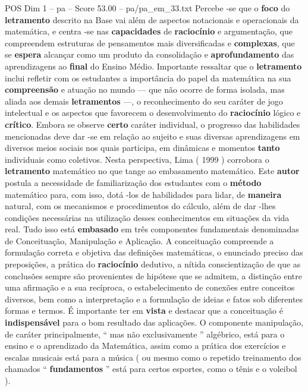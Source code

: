 \begin{textsample}{POS Dim 1 – pa – Score 53.00 – pa/pa\_em\_33.txt}
Percebe -se que o \textbf{foco} do \textbf{letramento} descrito na Base vai além de aspectos notacionais e operacionais da matemática, e centra -se nas \textbf{capacidades} de \textbf{raciocínio} e argumentação, que compreendem estruturas de pensamentos mais diversificadas e \textbf{complexas}, que se \textbf{espera} alcançar como um produto da consolidação e \textbf{aprofundamento} das aprendizagens ao \textbf{final} do Ensino Médio.
Importante ressaltar que o \textbf{letramento} inclui refletir com os estudantes a importância do papel da matemática na sua \textbf{compreensão} e atuação no mundo — que não ocorre de forma isolada, mas aliada aos demais \textbf{letramentos} —, o reconhecimento do seu caráter de jogo intelectual e os aspectos que favorecem o desenvolvimento do \textbf{raciocínio} lógico e \textbf{crítico}.
Embora se observe \textbf{certo} caráter individual, o progresso das habilidades mencionadas deve dar -se em relação ao sujeito e suas diversas aprendizagens em diversos meios sociais nos quais participa, em dinâmicas e momentos \textbf{tanto} individuais como coletivos.
Nesta perspectiva, Lima ( 1999 ) corrobora o \textbf{letramento} matemático no que tange ao embasamento matemático.
Este \textbf{autor} postula a necessidade de familiarização dos estudantes com o \textbf{método} matemático para, com isso, dotá -los de habilidades para lidar, de \textbf{maneira} natural, com os mecanismos e procedimentos do cálculo, além de dar -lhes condições necessárias na utilização desses conhecimentos em situações da vida real.
Tudo isso está \textbf{embasado} em três componentes fundamentais denominadas de Conceituação, Manipulação e Aplicação.
A conceituação compreende a formulação correta e objetiva das definições matemáticas, o enunciado preciso das preposições, a prática do \textbf{raciocínio} dedutivo, a nítida conscientização de que as conclusões sempre são provenientes de hipótese que se admitem, a distinção entre uma afirmação e a sua recíproca, o estabelecimento de conexões entre conceitos diversos, bem como a interpretação e a formulação de ideias e fatos sob diferentes formas e termos.
É importante ter em \textbf{vista} e destacar que a conceituação é \textbf{indispensável} para o bom resultado das aplicações.
O componente manipulação, de caráter principalmente, “ mas não exclusivamente ” algébrico, está para o ensino e o aprendizado da Matemática, assim como a prática dos exercícios e escalas musicais está para a música ( ou mesmo como o repetido treinamento dos chamados “ \textbf{fundamentos} ” está para certos esportes, como o tênis e o voleibol ).

\end{textsample}
